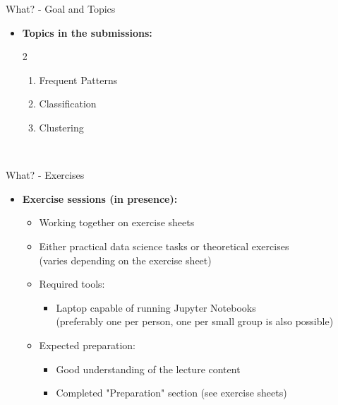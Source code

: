 \begin{frame}{What? - Goal and Topics}
\begin{itemize}
\begin{multicols}{2}
		      \end{multicols}
		      \vspace*{-0.75\multicolsep}
		\item \textbf{Topics in the submissions:}
		      \vspace*{-1\multicolsep}
		      \begin{multicols}{2}
			      \begin{enumerate}
				      \item Frequent Patterns
				      \item Classification
				      \item Clustering
			      \end{enumerate}
		      \end{multicols}
		      \
	\end{itemize}
\end{frame}

\begin{frame}{What? - Exercises}
	\begin{itemize}
		\item \textbf{Exercise sessions (in presence):}
		      \begin{itemize}
			      \item Working together on exercise sheets
			      \item Either practical data science tasks or theoretical exercises \\
			            {\color{gray}(varies depending on the exercise sheet)}
			      \item Required tools:
			            \begin{itemize}
				            \item Laptop capable of running Jupyter Notebooks \\
				                  {\color{gray}(preferably one per person, one per small group is also possible)}
			            \end{itemize}
			      \item Expected preparation:
			            \begin{itemize}
				            \item Good understanding of the lecture content
				            \item Completed "Preparation" section (see exercise sheets)
			            \end{itemize}
		      \end{itemize}
	\end{itemize}
\end{frame}

